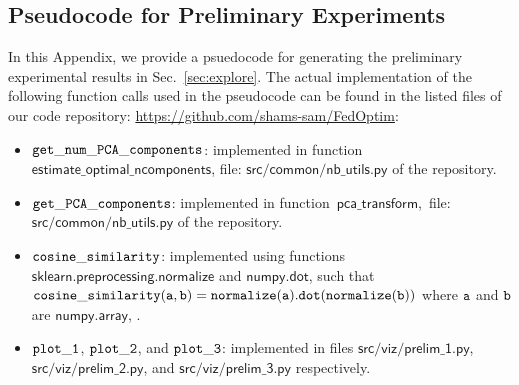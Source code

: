 \subsection{Pseudocode for Preliminary Experiments}
\label{app:pseudo}
In this Appendix, we provide a psuedocode for generating the preliminary experimental results in Sec.~\ref{sec:explore}. The actual implementation of the following function calls used in the pseudocode can be found in the listed files of our code repository: \url{https://github.com/shams-sam/FedOptim}:
\begin{itemize}[leftmargin=5mm]
    \item ${\tt get\_num\_PCA\_components}$: implemented in function $\mathsf{estimate\_optimal\_ncomponents}$, file: $\mathsf{src/common/nb\_utils.py}$ of the repository. 
    \item ${\tt get\_PCA\_components}$: implemented in function~$\mathsf{pca\_transform}$,~file:~$\mathsf{src/common/nb\_utils.py}$ of the repository. 
    \item ${\tt cosine\_similarity}$: implemented using functions $\mathsf{sklearn.preprocessing.normalize}$ and $\mathsf{numpy.dot}$, such that ${\tt cosine\_similarity(a,b)=normalize(a).dot(normalize(b))}$ where ${\tt a}$ and ${\tt b}$ are $\mathsf{numpy.array}$, .
    \item ${\tt plot\_1}$, ${\tt plot\_2}$, and ${\tt plot\_3}$: implemented in files $\mathsf{src/viz/prelim\_1.py}$,  $\mathsf{src/viz/prelim\_2.py}$, and  $\mathsf{src/viz/prelim\_3.py}$ respectively.
\end{itemize}
